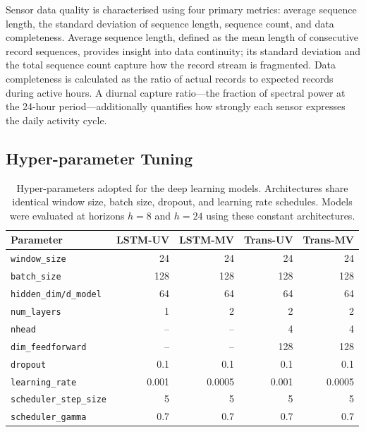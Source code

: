 \documentclass[journal,sensors,submit,pdftex,moreauthors]{Definitions/mdpi}
\begin{document}
Sensor data quality is characterised using four primary metrics: average sequence length, the standard deviation of sequence length, sequence count, and data completeness. Average sequence length, defined as the mean length of consecutive record sequences, provides insight into data continuity; its standard deviation and the total sequence count capture how the record stream is fragmented. Data completeness is calculated as the ratio of actual records to expected records during active hours. A diurnal capture ratio---the fraction of spectral power at the 24-hour period---additionally quantifies how strongly each sensor expresses the daily activity cycle.


\subsection{Hyper-parameter Tuning}

\begin{table}[htbp]
\caption{Hyper-parameters adopted for the deep learning models. Architectures share identical window size, batch size, dropout, and learning rate schedules. Models were evaluated at horizons $h=8$ and $h=24$ using these constant architectures.}\label{tab:hyperparameter_comparison}
\begin{tabular}{@{}lrrrr@{}}
\toprule
\textbf{Parameter} & \textbf{LSTM-UV} & \textbf{LSTM-MV} & \textbf{Trans-UV} & \textbf{Trans-MV} \\
\midrule
\texttt{window\_size} & 24 & 24 & 24 & 24 \\
\texttt{batch\_size} & 128 & 128 & 128 & 128 \\
\texttt{hidden\_dim/d\_model} & 64 & 64 & 64 & 64 \\
\texttt{num\_layers} & 1 & 2 & 2 & 2 \\
\texttt{nhead} & -- & -- & 4 & 4 \\
\texttt{dim\_feedforward} & -- & -- & 128 & 128 \\
\texttt{dropout} & 0.1 & 0.1 & 0.1 & 0.1 \\
\texttt{learning\_rate} & 0.001 & 0.0005 & 0.001 & 0.0005 \\
\texttt{scheduler\_step\_size} & 5 & 5 & 5 & 5 \\
\texttt{scheduler\_gamma} & 0.7 & 0.7 & 0.7 & 0.7 \\
\bottomrule
\end{tabular}
\end{table}
\end{document}
